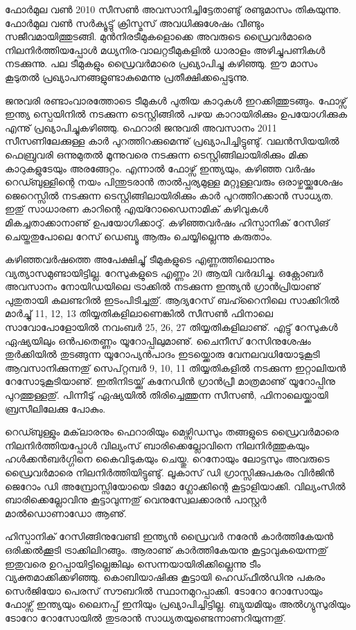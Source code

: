 ﻿
\vskip 2pt

ഫോര്‍മുല വണ്‍ 2010 സീസണ്‍ അവസാനിച്ചിട്ടേതാണ്ടു് രണ്ടുമാസം തികയുന്നു. ഫോര്‍മുല വണ്‍ സര്‍ക്യൂട്ടു് 
ക്രിസ്മസ് അവധിക്കുശേഷം വീണ്ടും സജീവമായിത്തുടങ്ങി. മുന്‍നിരടീമുകളൊക്കെ അവരുടെ ഡ്രൈവര്‍മാരെ 
നിലനിര്‍ത്തിയപ്പോള്‍ മധ്യനിര-വാലറ്റടീമുകളില്‍ ധാരാളം അഴിച്ചുപണികള്‍ നടക്കുന്നു. പല ടീമുകളും ഡ്രൈവര്‍മാരെ 
പ്രഖ്യാപിച്ചു കഴിഞ്ഞു. ഈ മാസം കൂടുതല്‍ പ്രഖ്യാപനങ്ങളുണ്ടാകുമെന്നു പ്രതീക്ഷിക്കപ്പെടുന്നു.

ജനുവരി രണ്ടാംവാരത്തോടെ ടീമുകള്‍ പുതിയ കാറുകള്‍ ഇറക്കിത്തുടങ്ങും. ഫോഴ്സ് ഇന്ത്യ സ്പെയിനില്‍ നടക്കുന്ന 
ടെസ്റ്റിങ്ങില്‍ പഴയ കാറായിരിക്കും ഉപയോഗിക്കുക എന്നു് പ്രഖ്യാപിച്ചുകഴിഞ്ഞു. ഫെറാരി ജനുവരി അവസാനം 2011 
സീസണിലേക്കുള്ള കാര്‍ പുറത്തിറക്കുമെന്നു് പ്രഖ്യാപിച്ചിട്ടുണ്ടു്. വലന്‍സിയയില്‍ ഫെബ്രുവരി ഒന്നുമുതല്‍ മൂന്നുവരെ 
നടക്കുന്ന ടെസ്റ്റിങ്ങിലായിരിക്കും മിക്ക കാറുകളുടേയും അരങ്ങേറ്റം. എന്നാല്‍ ഫോഴ്സ് ഇന്ത്യയും, കഴിഞ്ഞ വര്‍ഷം 
റെഡ്ബുള്ളിന്റെ നയം പിന്തുടരാന്‍ താല്‍പ്പര്യമുള്ള മറ്റുള്ളവരും ഒരാഴ്ചയ്ക്കുശേഷം ജെറെസ്സില്‍ നടക്കുന്ന 
ടെസ്റ്റിങ്ങിലായിരിക്കും കാര്‍ പുറത്തിറക്കാന്‍ സാധ്യത. ഇതു് സാധാരണ കാറിന്റെ എയ്റോഡൈനാമിക് കഴിവുകള്‍ 
മികച്ചതാക്കാനാണു് ഉപയോഗിക്കാറു്. കഴിഞ്ഞവര്‍ഷം ഹിസ്പാനിക് റേസിങ് ചെയ്തതുപോലെ റേസ് ഡെബ്യൂ ആരും 
ചെയ്യില്ലെന്നു കരുതാം.

കഴിഞ്ഞവര്‍ഷത്തെ അപേക്ഷിച്ചു് ടീമുകളുടെ എണ്ണത്തിലൊന്നും വ്യത്യാസമുണ്ടായിട്ടില്ല. റേസുകളുടെ എണ്ണം 20 
ആയി വര്‍ദ്ധിച്ചു. ഒക്റ്റോബര്‍ അവസാനം നോയിഡയിലെ ട്രാക്കില്‍ നടക്കുന്ന ഇന്ത്യന്‍ ഗ്രാന്‍പ്രിയാണു് പുതുതായി 
കലണ്ടറില്‍ ഇടംപിടിച്ചതു്. ആദ്യറേസ് ബഹ്റൈനിലെ സാക്കിറില്‍ മാര്‍ച്ചു് 11, 12, 13 തിയ്യതികളിലാണെങ്കില്‍ 
സീസണ്‍ ഫിനാലെ സാവോപോളോയില്‍ നവംബര്‍ 25, 26, 27 തിയ്യതികളിലാണു്. എട്ടു് റേസുകള്‍ ഏഷ്യയിലും 
ഒന്‍പതെണ്ണം യൂറോപ്പിലുമാണു്. ചൈനീസ് റേസിനുശേഷം തുര്‍ക്കിയില്‍ തുടങ്ങുന്ന യൂറോപ്യന്‍പാദം ഇടയ്ക്കൊരു 
വേനലവധിയോടുകൂടി ആവസാനിക്കുന്നതു് സെപ്റ്റമ്പര്‍ 9, 10, 11 തിയ്യതികളില്‍ നടക്കുന്ന ഇറ്റാലിയന്‍ 
റേസോടുകൂടിയാണു്. ഇതിനിടയ്ക്കു് കനേഡിന്‍ ഗ്രാന്‍പ്രീ മാത്രമാണു് യൂറോപ്പിനു പുറത്തുള്ളതു്. പിന്നീടു് ഏഷ്യയില്‍ 
തിരിച്ചെത്തുന്ന സീസണ്‍, ഫിനാലെയ്ക്കായി ബ്രസീലിലേക്കു പോകും.

റെഡ്ബുള്ളും മക്‌ലാരനും ഫെറാരിയും മെഴ്സിഡസും തങ്ങളുടെ ഡ്രൈവര്‍മാരെ നിലനിര്‍ത്തിയപ്പോള്‍ വില്യംസ് 
ബാരിക്കെല്ലോവിനെ നിലനിര്‍ത്തുകയും ഹള്‍ക്കന്‍ബര്‍ഗ്ഗിനെ കൈവിടുകയും ചെയ്തു. റെനോയും ലോട്ടസും അവരുടെ 
ഡ്രൈവര്‍മാരെ നിലനിര്‍ത്തിയിട്ടുണ്ടു്. ലൂകാസ് ഡി ഗ്രാസ്സിക്കുപകരം വിര്‍ജിന്‍ ജെറോം ഡി അമ്പ്രോസ്സിയോയെ ടിമോ 
ഗ്ലോക്കിന്റെ കൂട്ടാളിയാക്കി. വില്യംസില്‍ ബാരിക്കെല്ലോവിനു കൂട്ടാവുന്നതു് വെനുസ്വേലക്കാരന്‍ പാസ്റ്റര്‍ 
മാല്‍ഡൊണാഡോ ആണു്.

ഹിസ്പാനിക് റേസിങ്ങിനുവേണ്ടി ഇന്ത്യന്‍ ഡ്രൈവര്‍ നരേന്‍ കാര്‍ത്തികേയന്‍ ഒരിക്കല്‍ക്കൂടി ട്രാക്കിലിറങ്ങും. ആരാണു് 
കാര്‍ത്തികേയനു കൂട്ടാവുകയെന്നതു് ഇതുവരെ ഉറപ്പായിട്ടില്ലെങ്കിലും സെന്നയായിരിക്കില്ലെന്നു ടീം വ്യക്തമാക്കിക്കഴിഞ്ഞു. 
കൊബിയാഷിക്കു കൂട്ടായി ഹെഡ്ഫീല്‍ഡിനു പകരം സെര്‍ജിയോ പെരസ് സൗബറില്‍ സ്ഥാനമുറപ്പാക്കി. ടോറോ
 റോസോയും ഫോഴ്സ് ഇന്ത്യയും ലൈനപ്പ് ഇനിയും പ്രഖ്യാപിച്ചിട്ടില്ല. ബ്യുയമിയും അല്‍ഗ്യുസുരിയും ടോറോ റോസോയില്‍ 
തുടരാന്‍ സാധ്യതയുണ്ടെന്നാണറിയുന്നതു്.

